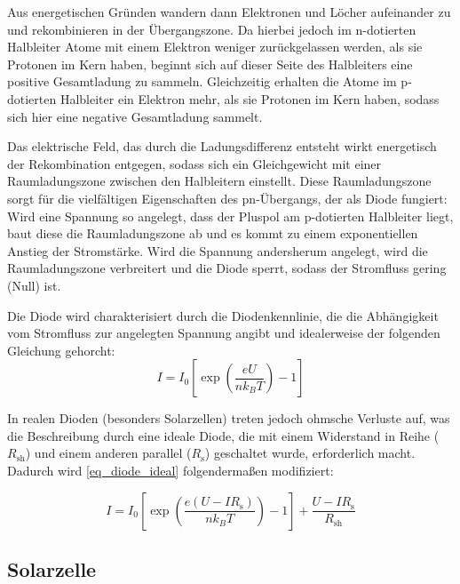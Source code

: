 \documentclass[
	a4paper,
	12pt,
	pagesize,
	ngerman
]{scrartcl}
\begin{document}
	Aus energetischen Gründen wandern dann Elektronen und Löcher aufeinander zu und rekombinieren in der Übergangszone.
	Da hierbei jedoch im n-dotierten Halbleiter Atome mit einem Elektron weniger zurückgelassen werden, als sie Protonen im Kern haben, beginnt sich auf dieser Seite des Halbleiters eine positive Gesamtladung zu sammeln.
	Gleichzeitig erhalten die Atome im p-dotierten Halbleiter ein Elektron mehr, als sie Protonen im Kern haben, sodass sich hier eine negative Gesamtladung sammelt.

	Das elektrische Feld, das durch die Ladungsdifferenz entsteht wirkt energetisch der Rekombination entgegen, sodass sich ein Gleichgewicht mit einer Raumladungszone zwischen den Halbleitern einstellt.
	Diese Raumladungszone sorgt für die vielfältigen Eigenschaften des pn-Übergangs, der als Diode fungiert:
	Wird eine Spannung so angelegt, dass der Pluspol am p-dotierten Halbleiter liegt, baut diese die Raumladungszone ab und es kommt zu einem exponentiellen Anstieg der Stromstärke.
	Wird die Spannung andersherum angelegt, wird die Raumladungszone verbreitert und die Diode sperrt, sodass der Stromfluss gering (Null) ist.

	Die Diode wird charakterisiert durch die Diodenkennlinie, die die Abhängigkeit vom Stromfluss zur angelegten Spannung angibt und idealerweise der folgenden Gleichung gehorcht:
	\begin{equation}
		\label{eq_diode_ideal}
		I = I_0 \left[ \exp \left( \frac{eU}{n k_B T} \right) -1 \right] %
	\end{equation}

	In realen Dioden (besonders Solarzellen) treten jedoch ohmsche Verluste auf, was die Beschreibung durch eine ideale Diode, die mit einem Widerstand in Reihe ($R_\text{sh}$) und einem anderen parallel ($R_\text{s}$) geschaltet wurde, erforderlich macht.
	Dadurch wird \cref{eq_diode_ideal} folgendermaßen modifiziert:

	\begin{equation}
		\label{eq_diode_real}
		I = I_0 \left[ \exp \left( \frac{e (U-I R_\text{s})}{n k_B T} \right) -1 \right] + \frac{U-I R_\text{s}}{R_\text{sh}}%
	\end{equation}

	\subsection{Solarzelle}
\end{document}
